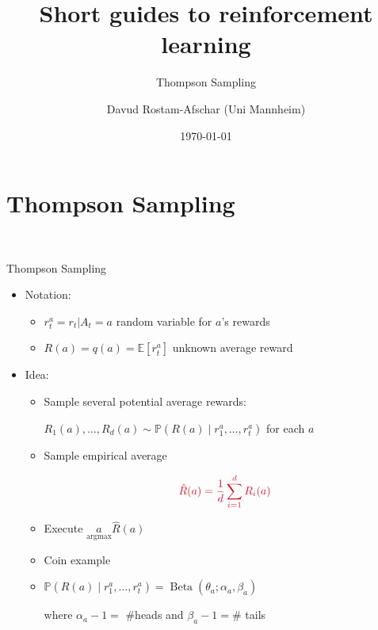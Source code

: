 \documentclass[11pt,table]{beamer}
\title[]{Short guides to reinforcement learning}
\subtitle[]{Thompson Sampling}
\author[D. Rostam-Afschar]{\textcolor{gray1}{Davud Rostam-Afschar (Uni Mannheim)}}
\date[]{\today}
\begin{document}
\begin{frame}[plain]
  \titlepage
\end{frame}


\section{Thompson Sampling}
{
\begin{frame}
\centering
\Huge
\textcolor{white}{How to update your priors about rewards?}
\thispagestyle{empty}
\end{frame}
}





\begin{frame}{Thompson Sampling}


    \begin{itemize}
        \item Notation:

\begin{itemize}
     

\item $r^{a}_t=r_t|A_t=a$ random variable for $a$'s rewards
\item $R(a)=q(a)=\mathbb{E}\left[r^{a}_t\right]$ unknown average reward 
    \end{itemize}



        \item Idea:
\begin{itemize}
    \item  Sample several potential average rewards:


\textcolor{red1}{$R_{1}(a), \ldots, R_{d}(a) \sim \mathbb{P}\left(R(a) \mid r_{1}^{a}, \ldots, r_{t}^{a}\right)$} for each $a$


\item  Sample empirical average


$$
\textcolor{red1}{\hat{R}(a)=\frac{1}{d} \sum_{i=1}^{d} R_{i}(a)}
$$


\item  Execute \textcolor{red1}{$\underset{\operatorname{argmax}}{a} \hat{R}(a)$}


\item  Coin example


\item $\mathbb{P}\left(R(a) \mid r_{1}^{a}, \ldots, r_{t}^{a}\right)=\operatorname{Beta}\left(\theta_{a} ; \alpha_{a}, \beta_{a}\right)$


where $\alpha_{a}-1=$ \#heads and $\beta_{a}-1=\#$ tails 
\end{itemize} 
    \end{itemize}
\end{frame}
\end{document}
